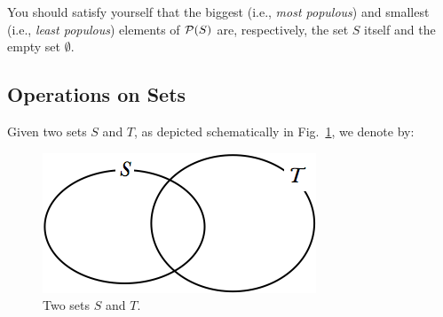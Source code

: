 \smallskip


\smallskip

\noindent
You should satisfy yourself that the biggest (i.e., {\em most populous}) and smallest (i.e., {\em least populous}) elements of $\mbox{$\cal P$}(S)$ are, respectively, the set $S$ itself and the empty set $\emptyset$.

\subsection{Operations on Sets}
\label{sec:operations-on-sets}

 
Given two sets $S$ and $T$, as depicted schematically in Fig.~\ref{fig:setInitial}, we denote by:
\begin{figure}[htb]
\begin{center}
        \includegraphics[scale=0.4]{FiguresMaths/setInitial}
        \caption{Two sets $S$ and $T$.}
        \label{fig:setInitial}
\end{center}
\end{figure}
